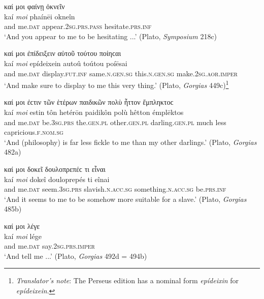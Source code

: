 \begin{exe}
\ex καί μοι φαίνῃ ὀκνεῖν\\
\gll kaí \emph{moi} phaínēi okneîn\\
and me.\textsc{dat} appear.\textsc{2sg.prs.pass} hesitate.\textsc{prs.inf}\\
\trans `And you appear to me to be hesitating ...' (Plato, \textit{Symposium} 218c)
\label{kaimoi46}
\end{exe}

\begin{exe}
\ex καί μοι ἐπίδειξειν αὐτοῦ τούτου ποίηϲαι\\
\gll kaí \emph{moi} epídeixein autoû toútou poíēsai\\
and me.\textsc{dat} display.\textsc{fut.inf} same.\textsc{n.gen.sg}
this.\textsc{n.gen.sg} make.\textsc{2sg.aor.imper}\\
\trans `And make sure to display to me this very thing.' (Plato, \textit{Gorgias} 449c)\footnote{\emph{Translator's note}: The Perseus edition has a nominal form \textit{epídeixin} for \textit{epídeixein}.}
\label{kaimoi47}
\end{exe}

\begin{exe}
\ex καί μοι ἐϲτιν τῶν ἑτέρων παιδικῶν πολὺ ἧττον ἔμπληκτοϲ\\
\gll kaí \emph{moi} estin tôn hetérōn paidikôn polù hêtton émplēktos\\
and me.\textsc{dat} be.\textsc{3sg.prs} the.\textsc{gen.pl} other.\textsc{gen.pl} darling.\textsc{gen.pl} much less capricious.\textsc{f.nom.sg}\\
\trans `And (philosophy) is far less fickle to me than my other darlings.' (Plato, \textit{Gorgias} 482a)
\label{kaimoi48}
\end{exe}

\begin{exe}
\ex καί μοι δοκεῖ δουλοπρεπέϲ τι εἶναι\\
\gll kaí \emph{moi} dokeî douloprepés ti eînai\\
and me.\textsc{dat} seem.\textsc{3sg.prs} slavish.\textsc{n.acc.sg}
something.\textsc{n.acc.sg} be.\textsc{prs.inf}\\
\trans `And it seems to me to be somehow more suitable for a slave.' (Plato, \textit{Gorgias} 485b)
\label{kaimoi49}
\end{exe}

\begin{exe}
\ex καί μοι λέγε\\
\gll kaí \emph{moi} lége\\
and me.\textsc{dat} say.\textsc{2sg.prs.imper}\\
\trans `And tell me ...' (Plato, \textit{Gorgias} 492d = 494b)
\label{kaimoi50}
\end{exe}

